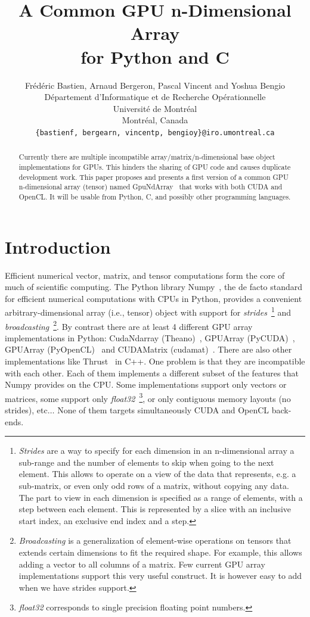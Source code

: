 \documentclass{article} %
\title{A Common GPU n-Dimensional Array \\
 for Python and C}
\author{
Frédéric Bastien, Arnaud Bergeron, Pascal Vincent and Yoshua Bengio \\
D\'epartement d'Informatique et de Recherche Op\'erationnelle\\
Universit\'e de Montr\'eal\\
Montr\'eal, Canada \\
\texttt{\{bastienf, bergearn, vincentp, bengioy\}@iro.umontreal.ca} \\
}
\begin{document}
\maketitle

\begin{abstract}
Currently there are multiple incompatible array/matrix/n-dimensional base object implementations for GPUs. 
This hinders the sharing of GPU code and causes duplicate development work.
This paper proposes and presents a first version of a common GPU n-dimensional array (tensor) named GpuNdArray~\citep{GpuNdArray} that works with both CUDA and OpenCL.
It will be usable from Python, C, and possibly other programming languages.
\end{abstract}

\section{Introduction}
Efficient numerical vector, matrix, and tensor computations form the core of much of scientific computing.
The Python library Numpy~\citep{numpy-2007}, the de facto standard for efficient numerical computations with CPUs in Python, provides a convenient 
arbitrary-dimensional array (i.e., tensor) object with support for \emph{strides}~\footnote{
\emph{Strides} are a way to specify for each dimension in an n-dimensional array a sub-range and the number of elements to skip when going
to the next element. 
This allows to operate on a view of the data that represents, e.g. a sub-matrix, or even only odd rows of a matrix, without copying any data.
The part to view in each dimension is specified as a range of elements, with a step between each element.
This is represented by a slice with an inclusive start index, an exclusive end index and a step.
}
and \emph{broadcasting}~\footnote{
\emph{Broadcasting} is a generalization of element-wise operations on tensors that extends certain dimensions to fit the required shape.
For example, this allows adding a vector to all columns of a matrix.
Few current GPU array implementations support this very useful construct.
It is however easy to add when we have strides support.
}.
By contrast there are at least 4 different GPU array implementations in
Python: CudaNdarray (Theano)~\citep{bergstra+al:2010-scipy},
GPUArray (PyCUDA)~\citep{kloeckner_pycuda_2009},
GPUArray (PyOpenCL)~\citep{kloeckner_pycuda_2009} and
CUDAMatrix (cudamat)~\citep{cudamat-TR2009}.
There are also other implementations like Thrust~\citep{Thrust} in C++.
One problem is that they are incompatible with each other.
Each of them implements a different subset of the features that Numpy provides on the CPU.
Some implementations support only vectors or matrices, some support only \emph{float32}~\footnote{
\emph{float32} corresponds to single precision floating point numbers.
}, or only contiguous memory layouts (no strides), etc$\ldots$
None of them targets simultaneously CUDA and OpenCL back-ends.
\end{document}
